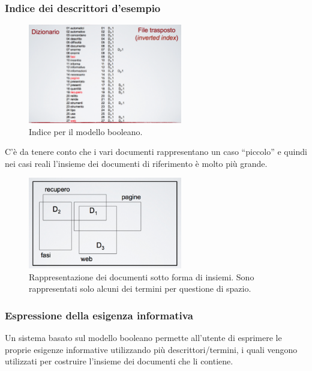 \subsubsection{Indice dei descrittori d'esempio}

\begin{figure}[htbp]
	\centering
	\includegraphics[width=0.6\textwidth]{./images/l7-index-bool}
	\caption{Indice per il modello booleano.}
\end{figure}

C'è da tenere conto che i vari documenti rappresentano un caso ``piccolo'' e quindi nei casi reali l'insieme dei documenti di riferimento è molto più grande.

\begin{figure}[htbp]
	\centering
	\includegraphics[width=0.6\textwidth]{./images/l7-insieme}
	\caption{Rappresentazione dei documenti sotto forma di insiemi. Sono rappresentati solo alcuni dei termini per questione di spazio.}
\end{figure}

\subsubsection{Espressione della esigenza informativa}

Un sistema basato sul modello booleano permette all'utente di esprimere le proprie esigenze informative utilizzando più descrittori/termini, i quali vengono utilizzati per costruire l'insieme dei documenti che li contiene.

